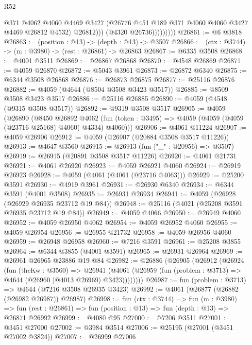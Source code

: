 \begin{lexlean}{R52}
\begin{coremodule}
                          @371
                          @4062
                          @4060
                          @4469
                          @3427
                          (@26776 @451 @189 @371 @4060 @4060 @3427 @4469 @26812 @4532)
                          @26812)))
                    (@4320 @26736)))))))))
@26861 := @6 @3818
@26863 := (position : @13) -> (depth : @13) -> @3507
@26866 := (ctx : @3744) -> (m : @3980) -> (rest : @26861) -> @26863
@26867 := @6335 @3508
@26868 := @4001 @3511
@26869 := @26867 @26868
@26870 := @4548 @26869
@26871 := @4059 @26870
@26872 := @5043 @3961
@26873 := @26872 @6340
@26875 := @6344 @3508 @26868
@26876 := @26873 @26875
@26877 := @25116 @26876
@26882 := @4059 (@4644 (@8504 @3508 @3423 @3517))
@26885 := @8509 @3508 @3423 @3517
@26886 := @25116 @26885
@26890 := @4059 (@4548 (@9315 @3508 @3517))
@26892 := @9319 @3508 @3517
@26905 := @4059
    (@26890
      (@8450
        @26892
        @4062
        (fun (token : @3495) => @4059 (@4059 (@4059 (@23716 @25168) @4060) @4334) @4060)))
@26906 := @4061 @11224
@26907 := @4059 @26906
@26912 := @4059 (@26907 (@20884 @3508 @3517 @11226))
@26913 := @4647 @3560
@26915 := @26913 (fun ("_" : @20956) => @3507)
@26919 := @26915 (@20891 @3508 @3517 @11226)
@26920 := @4061 @21731
@26921 := @4061 @26920
@26923 := @4059 @26921 @4060
@26924 := @26919 @26923
@26928 := @4059 (@4061 (@4061 (@23716 @4063)))
@26929 := @25200 @3591
@26930 := @4919 @3961
@26931 := @26930 @6340
@26934 := @6344 @3591 (@4001 @3508)
@26935 := @26931 @26934
@26941 := @4059 (@26928 (@26929 @26935 @23712 @19 @84))
@26948 := @25116 (@4021 (@25208 @3591 @26935 @23712 @19 @84))
@26949 := @4059 @4066
@26950 := @26949 @4060
@26952 := @4059 @26950 @4062
@26954 := @4059 @26952 @4060
@26955 := @4059 @26954
@26956 := @26955 @21732
@26958 := @4059 @26956 @4060
@26959 := @26948 @26958
@26960 := @7216 @3591
@26961 := @25208 @3855
@26964 := @6344 @3855 (@4001 @3591)
@26965 := @26931 @26964
@26969 := @26961 @26965 @23886 @19 @84
@26982 := @26886
    (@26905
      (@26912
        (@26924
          (fun (theKw : @3560) =>
          @26941 (@4061 (@26959 (fun (problem : @3713) => @4644 (@26960 (@4013 @26969) @3423))))))))
@26987 := fun (problem : @3713) => @4644 (@7216 @3508 @26935 @3423)
@26992 := @4061 (@26877 (@26882 (@26982 @26987)) @26987)
@26998 := fun (ctx : @3744) =>
  fun (m : @3980) =>
  fun (rest : @26861) => fun (position : @13) => fun (depth : @13) => @26871 @26992
@26999 := @4080 @95
@27000 := @7206 @3511
@27001 := @3451 @27000
@27002 := @3984 @3514
@27006 := @25195 (@27001 (@3451 @27002 @3824))
@27007 := @26999 @27006

\end{coremodule}
\end{lexlean}
